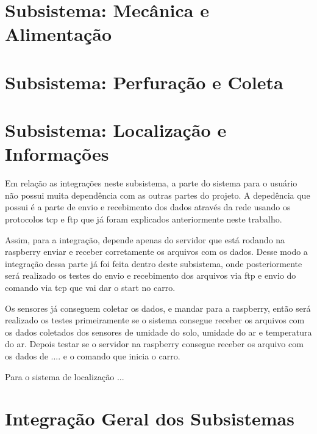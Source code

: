\section{Subsistema: Mecânica e Alimentação}

\section{Subsistema: Perfuração e Coleta}

\section{Subsistema: Localização e Informações}

Em relação as integrações neste subsistema, a parte do sistema para o usuário não possui muita dependência com as outras partes do projeto. A depedência que possui é a parte de envio e recebimento dos dados através da rede usando os protocolos tcp e ftp que já foram explicados anteriormente neste trabalho.

Assim, para a integração, depende apenas do servidor que está rodando na raspberry enviar e receber corretamente os arquivos com os dados. Desse modo a integração dessa parte já foi feita dentro deste subsistema, onde posteriormente será realizado os testes do envio e recebimento dos arquivos via ftp e envio do comando via tcp que vai dar o start no carro. 

Os sensores já conseguem coletar os dados, e mandar para a raspberry, então será realizado os testes primeiramente se o sistema consegue receber os arquivos com os dados coletados dos sensores de umidade do solo, umidade do ar e temperatura do ar. Depois testar se o servidor na raspberry consegue receber os arquivo com os dados de .... e o comando que inicia o carro.

Para o sistema de localização ...

\section{Integração Geral dos Subsistemas}


